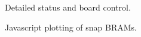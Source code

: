 \documentclass[letterpaper,10pt,english]{sphinxmanual}
\begin{document}
\begin{figure}[htbp]
\centering
\capstart

\caption{Detailed status and board control.}\end{figure}
\begin{figure}[htbp]
\centering
\capstart

\caption{Javascript plotting of snap BRAMs.}\end{figure}
\end{document}

